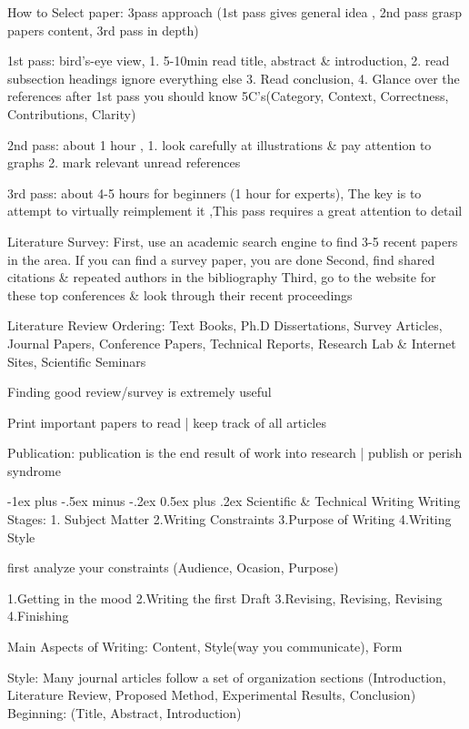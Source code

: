\documentclass[10pt,landscape]{article}
\makeatletter
\renewcommand{\section}{\@startsection{section}{1}{0mm}%
                                {-1ex plus -.5ex minus -.2ex}%
                                {0.5ex plus .2ex}%
                                {\normalfont\large\bfseries}}
\makeatother
\begin{document}
\begin{multicols*}{3}
How to Select paper: 3\-pass approach (1st pass gives general idea , 2nd pass grasp papers content, 3rd pass in depth)

1st pass: bird's-eye view, 1. 5-10min read title, abstract \& introduction, 2. read subsection headings ignore everything else
3. Read conclusion, 4. Glance over the references 
after 1st pass you should know 5C's(Category, Context, Correctness, Contributions, Clarity)

2nd pass: about 1 hour , 1. look carefully at illustrations \& pay attention to graphs
2. mark relevant unread references

3rd pass: about 4-5 hours for beginners (1 hour for experts), The key is to attempt to virtually reimplement it
,This pass requires a great attention to detail

Literature Survey:
First, use an academic search engine to
find 3-5 recent papers in the area. If you can find a survey paper, you are done
Second, find shared citations \& repeated authors in
the bibliography Third, go to the website for these top conferences \&
look through their recent proceedings

Literature Review Ordering: Text Books, Ph.D Dissertations, Survey Articles, Journal Papers,
Conference Papers, Technical Reports, Research Lab \& Internet Sites, Scientific Seminars

Finding good review/survey is extremely useful

Print important papers to read | keep track of all articles

Publication: publication is the end result of work into research |
publish or perish syndrome 

\section{Scientific \& Technical Writing}
Writing Stages: 1. Subject Matter 2.Writing Constraints 3.Purpose of Writing 4.Writing Style

first analyze your constraints (Audience, Ocasion, Purpose)

1.Getting in the mood 2.Writing the first Draft 3.Revising, Revising, Revising 4.Finishing

Main Aspects of Writing: Content, Style(way you communicate), Form

Style: Many journal articles follow a set of organization sections (Introduction, Literature Review, 
Proposed Method, Experimental Results, Conclusion) Beginning: (Title, Abstract, Introduction)


\end{multicols*}
\end{document}
